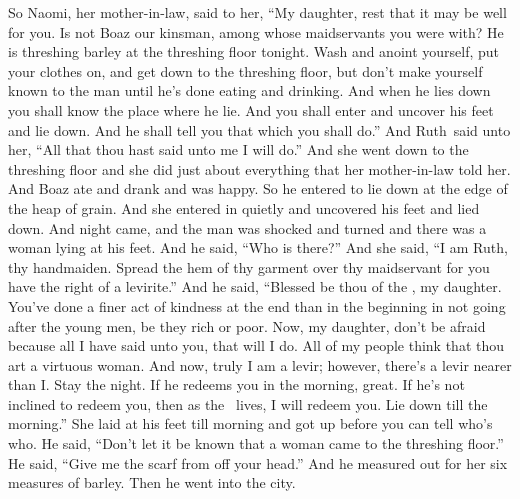 
\begin{inparaenum}
   So Naomi, her mother-in-law, said to her, ``My daughter, rest that it may be well for you.%
   Is not Boaz our kinsman, among whose maidservants you were with? He is threshing barley at the threshing floor tonight.%
   Wash and anoint yourself, put your clothes on, and get down to the threshing floor, but don't make yourself known to the man until he's done eating and drinking.%
   And when he lies down you shall know the place where he lie. And you shall enter and uncover his feet and lie down. And he shall tell you that which you shall do.''%
   And Ruth\understood\ said unto her, ``All that thou hast said unto me I will do.''%
   And she went down to the threshing floor and she did just about everything that her mother-in-law told her.%
   And Boaz ate and drank and was happy. So he entered to lie down at the edge of the heap of grain. And she entered in quietly and uncovered his feet and lied down.%
   And night came, and the man was shocked and turned and there was a woman lying at his feet.%
   And he said, ``Who is there?'' And she said, ``I am Ruth, thy handmaiden. Spread the hem of thy garment over thy maidservant for you have the right of a levirite.''%
   And he said, ``Blessed be thou of the \lord, my daughter. You've done a finer act of kindness at the end than in the beginning in not going after the young men, be they rich or poor.%
   Now, my daughter, don't be afraid because all I have said unto you, that will I do. All of my people think that thou art a virtuous woman.%
   And now, truly I am a levir; however, there's a levir nearer than I.%
   Stay the night. If he redeems you in the morning, great. If he's not inclined to redeem you, then as the \lord\ lives, I will redeem you. Lie down till the morning.''%
   She laid at his feet till morning and got up before you can tell who's who. He said, ``Don't let it be known that a woman came to the threshing floor.''%
   He said, ``Give me the scarf from off your head.'' And he measured out for her six measures of barley. Then he went into the city.%

\end{inparaenum}
